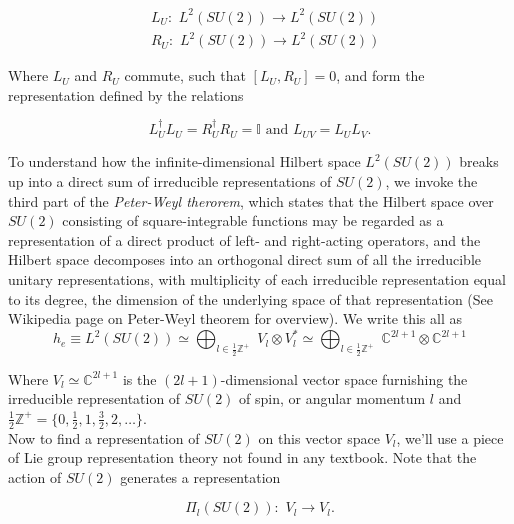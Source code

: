 \begin{align}
&L_U : \,\, L^2 (SU(2)) \rightarrow L^2 (SU(2)) \\
&R_U : \,\, L^2 (SU(2)) \rightarrow L^2 (SU(2))
\end{align}

\noindent Where $L_U$ and $R_U$ commute, such that $[L_U, R_U]=0$, and form the representation defined by the relations 

\begin{equation}
L_U^\dagger L_U = R_U^\dagger R_U = \mathbb{I} \text{ and } L_{UV} = L_U L_V.
\end{equation}

\noindent To understand how the infinite-dimensional Hilbert space $L^2(SU(2))$ breaks up into a direct sum of irreducible representations of $SU(2)$, we invoke the third part of the \textit{Peter-Weyl therorem}, which states that the Hilbert space over $SU(2)$ consisting of square-integrable functions may be regarded as a representation of a direct product of left- and right-acting operators, and the Hilbert space decomposes into an orthogonal direct sum of all the irreducible unitary representations, with multiplicity of each irreducible representation equal to its degree, the dimension of the underlying space of that representation (See Wikipedia page on Peter-Weyl theorem for overview). We write this all as \\

\begin{equation}
h_e \equiv L^2(SU(2)) \simeq \bigoplus_{l \in \frac{1}{2}\mathbb{Z}^+} \,\, V_l \otimes V_l^* \simeq \bigoplus_{l \in \frac{1}{2}\mathbb{Z}^+} \,\, \mathbb{C}^{2l+1} \otimes \mathbb{C}^{2l+1}
\end{equation}

\noindent Where $V_l \simeq \mathbb{C}^{2l+1}$ is the $(2l+1)$-dimensional vector space furnishing the irreducible representation of $SU(2)$ of spin, or angular momentum $l$ and $\frac{1}{2}\mathbb{Z}^+ = \{0,\frac{1}{2},1,\frac{3}{2},2,\dots\}$. \\

\noindent Now to find a representation of $SU(2)$ on this vector space $V_l$, we'll use a piece of Lie group representation theory not found in any textbook. Note that the action of $SU(2)$ generates a representation

\begin{equation}
\Pi_l (SU(2)) : \,\, V_l \rightarrow V_l.
\end{equation}


